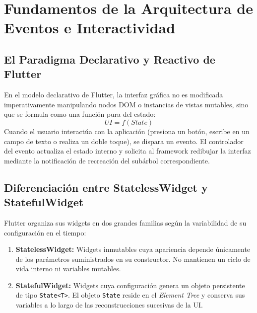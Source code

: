 \documentclass[12pt,a4paper]{article}
\begin{document}
  \section{Fundamentos de la Arquitectura de Eventos e Interactividad}

  \subsection{El Paradigma Declarativo y Reactivo de Flutter}
  En el modelo declarativo de Flutter, la interfaz gráfica no es modificada imperativamente manipulando nodos DOM o instancias de vistas mutables, sino que se formula como una función pura del estado:
  \begin{equation}
  UI = f(State)
  \end{equation}
  Cuando el usuario interactúa con la aplicación (presiona un botón, escribe en un campo de texto o realiza un doble toque), se dispara un evento. El controlador del evento actualiza el estado interno y solicita al framework redibujar la interfaz mediante la notificación de recreación del subárbol correspondiente.

  \subsection{Diferenciación entre StatelessWidget y StatefulWidget}
  Flutter organiza sus widgets en dos grandes familias según la variabilidad de su configuración en el tiempo:
  \begin{enumerate}[leftmargin=*]
      \item \textbf{StatelessWidget:} Widgets inmutables cuya apariencia depende únicamente de los parámetros suministrados en su constructor. No mantienen un ciclo de vida interno ni variables mutables.
      \item \textbf{StatefulWidget:} Widgets cuya configuración genera un objeto persistente de tipo \texttt{State<T>}. El objeto \texttt{State} reside en el \textit{Element Tree} y conserva sus variables a lo largo de las reconstrucciones sucesivas de la UI.
  \end{enumerate}
\end{document}
